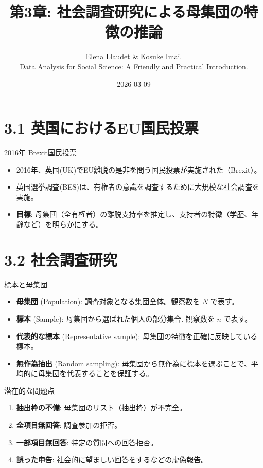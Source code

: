 \documentclass[
  ignorenonframetext,
]{beamer}
\title{第3章: 社会調査研究による母集団の特徴の推論}
\subtitle{Elena Llaudet \& Kosuke Imai.\\
Data Analysis for Social Science: A Friendly and Practical
Introduction.}
\author{}
\date{\vspace{-2.5em}2026-03-09}
\providecommand{\tightlist}{%
  \setlength{\itemsep}{0pt}\setlength{\parskip}{0pt}}
\begin{document}
\frame{\titlepage}

\hypertarget{ux82f1ux56fdux306bux304aux3051ux308beuux56fdux6c11ux6295ux7968}{%
\section{3.1
英国におけるEU国民投票}\label{ux82f1ux56fdux306bux304aux3051ux308beuux56fdux6c11ux6295ux7968}}

\begin{frame}{2016年 Brexit国民投票}
\protect\hypertarget{ux5e74-brexitux56fdux6c11ux6295ux7968}{}
\begin{itemize}
\tightlist
\item
  2016年、英国(UK)でEU離脱の是非を問う国民投票が実施された（Brexit）。
\item
  英国選挙調査(BES)は、有権者の意識を調査するために大規模な社会調査を実施。
\item
  \textbf{目標}:
  母集団（全有権者）の離脱支持率を推定し、支持者の特徴（学歴、年齢など）を明らかにする。
\end{itemize}
\end{frame}

\hypertarget{ux793eux4f1aux8abfux67fbux7814ux7a76}{%
\section{3.2 社会調査研究}\label{ux793eux4f1aux8abfux67fbux7814ux7a76}}

\begin{frame}{標本と母集団}
\protect\hypertarget{ux6a19ux672cux3068ux6bcdux96c6ux56e3}{}
\begin{itemize}
\tightlist
\item
  \textbf{母集団} (Population): 調査対象となる集団全体。観察数を \(N\)
  で表す。
\item
  \textbf{標本} (Sample): 母集団から選ばれた個人の部分集合. 観察数を
  \(n\) で表す。
\item
  \textbf{代表的な標本} (Representative sample):
  母集団の特徴を正確に反映している標本。
\item
  \textbf{無作為抽出} (Random sampling):
  母集団から無作為に標本を選ぶことで、平均的に母集団を代表することを保証する。
\end{itemize}
\end{frame}

\begin{frame}{潜在的な問題点}
\protect\hypertarget{ux6f5cux5728ux7684ux306aux554fux984cux70b9}{}
\begin{enumerate}
\tightlist
\item
  \textbf{抽出枠の不備}: 母集団のリスト（抽出枠）が不完全。
\item
  \textbf{全項目無回答}: 調査参加の拒否。
\item
  \textbf{一部項目無回答}: 特定の質問への回答拒否。
\item
  \textbf{誤った申告}: 社会的に望ましい回答をするなどの虚偽報告。
\end{enumerate}
\end{frame}
\end{document}
